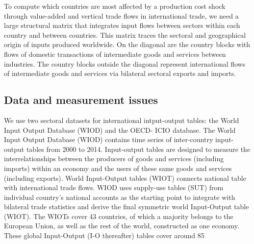 \documentclass[11pt,a4paper]{article}
\begin{document}
To compute which countries are most affected by a production cost shock through value-added and vertical trade flows in international trade, we need a large structural matrix that integrates input flows between sectors within each country and between countries. This matrix traces the sectoral and geographical origin of inputs produced worldwide. On the diagonal are the country blocks with flows of domestic transactions of intermediate goods and services between industries. The country blocks outside the diagonal represent international flows of intermediate goods and services via bilateral sectoral exports and imports. 


\subsection{Data and measurement issues}
\label{subsec:data}

We use two sectoral datasets for international intput-output tables: the World Input Output Database (WIOD) and the OECD- ICIO database.
The World Input Output Database (WIOD) contains time series of inter-country input-output tables from 2000 to 2014. Input-output tables are designed to measure the interrelationships between the producers of goods and services (including imports) within an economy and the users of these same goods and services (including exports). World Input-Output tables (WIOT) connects national table with international trade flows. WIOD uses supply-use tables (SUT) from individual country’s national accounts as the starting point to integrate with bilateral trade statistics and derive the final symmetric world Input-Output table (WIOT). The WIOTs cover 43 countries, of which a majority belongs to the European Union, as well as the rest of the world, constructed as one economy. These global Input-Output (I-O thereafter) tables cover around 85%
\end{document}
